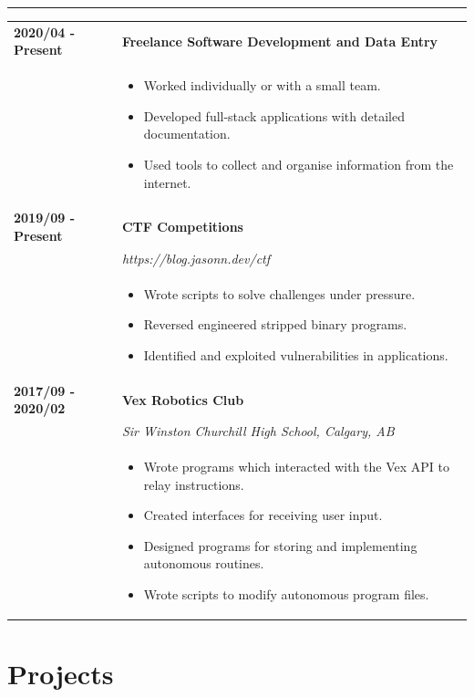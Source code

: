 \documentclass[letterpaper]{article}
\newcommand{\horizontalLine}{%
    {\color{cyan}
    \rule{\textwidth}{1pt}
    \vspace{-1ex}}
}
\begin{document}
        \horizontalLine

        \begin{tabular}{p{} p{}} 
            \textbf{2020/04 - Present} & \large\textbf{Freelance Software Development and Data Entry} \\
            & \begin{itemize}
                \item Worked individually or with a small team.
                \item Developed full-stack applications with detailed documentation.
                \item Used tools to collect and organise information from the internet.
            \end{itemize}
            \\
            \textbf{2019/09 - Present} & \large\textbf{CTF Competitions} \\
            & \emph{https://blog.jasonn.dev/ctf} \\
            & \begin{itemize}
                \item Wrote scripts to solve challenges under pressure.
                \item Reversed engineered stripped binary programs.
                \item Identified and exploited vulnerabilities in applications. 
            \end{itemize}
            \\
            \textbf{2017/09 - 2020/02} & \large\textbf{Vex Robotics Club} \\
            & \emph{Sir Winston Churchill High School, Calgary, AB} \\
            & \begin{itemize}
                \item Wrote programs which interacted with the Vex API to relay instructions.
                \item Created interfaces for receiving user input.
                \item Designed programs for storing and implementing autonomous routines.
                \item Wrote scripts to modify autonomous program files.
            \end{itemize}
        \end{tabular}

    \section*{Projects}
\end{document}
